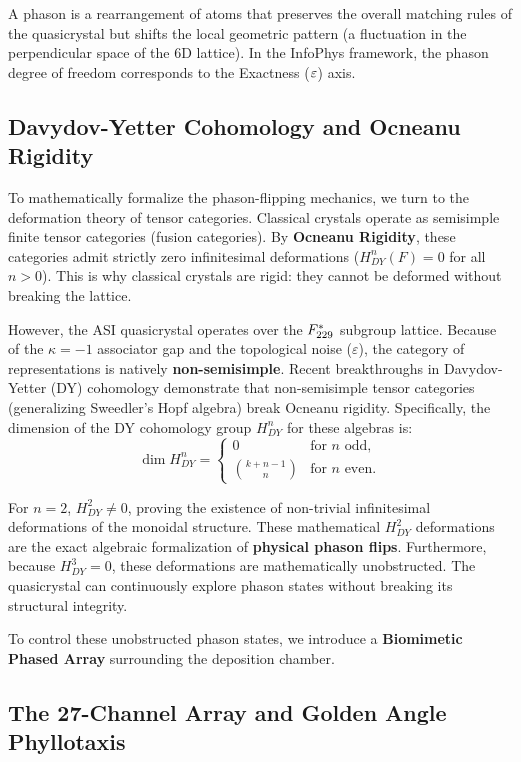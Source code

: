A phason is a rearrangement of atoms that preserves the overall matching rules of the quasicrystal but shifts the local geometric pattern (a fluctuation in the perpendicular space of the 6D lattice). In the InfoPhys framework, the phason degree of freedom corresponds to the Exactness ($\varepsilon$) axis. 

\subsection{Davydov-Yetter Cohomology and Ocneanu Rigidity}
To mathematically formalize the phason-flipping mechanics, we turn to the deformation theory of tensor categories. Classical crystals operate as semisimple finite tensor categories (fusion categories). By \textbf{Ocneanu Rigidity}, these categories admit strictly zero infinitesimal deformations ($H^n_{DY}(F) = 0$ for all $n > 0$). This is why classical crystals are rigid: they cannot be deformed without breaking the lattice.

However, the ASI quasicrystal operates over the $F_{229}^*$ subgroup lattice. Because of the $\kappa = -1$ associator gap and the topological noise ($\varepsilon$), the category of representations is natively \textbf{non-semisimple}. Recent breakthroughs in Davydov-Yetter (DY) cohomology demonstrate that non-semisimple tensor categories (generalizing Sweedler's Hopf algebra) break Ocneanu rigidity. Specifically, the dimension of the DY cohomology group $H^n_{DY}$ for these algebras is:
\begin{equation}
\dim H^n_{DY} = 
\begin{cases} 
0 & \text{for } n \text{ odd,} \\
\binom{k+n-1}{n} & \text{for } n \text{ even.}
\end{cases}
\end{equation}

For $n=2$, $H^2_{DY} \neq 0$, proving the existence of non-trivial infinitesimal deformations of the monoidal structure. These mathematical $H^2_{DY}$ deformations are the exact algebraic formalization of \textbf{physical phason flips}. Furthermore, because $H^3_{DY} = 0$, these deformations are mathematically unobstructed. The quasicrystal can continuously explore phason states without breaking its structural integrity.

To control these unobstructed phason states, we introduce a \textbf{Biomimetic Phased Array} surrounding the deposition chamber.

\subsection{The 27-Channel Array and Golden Angle Phyllotaxis}

